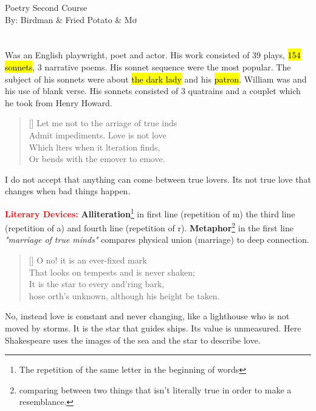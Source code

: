 \documentclass[12pt, a4paper]{article}
\begin{document}
\begin{center}
\huge{Poetry Second Course}\\[0.5cm]
\Large{By: Birdman \& Fried Potato \& Mơ}\\[1cm]
\end{center}

\section*{}
{\fontpar
Was an English playwright, poet and actor. His work consisted
of 39 plays, \hl{154 sonnets}, 3 narrative poems. His sonnet sequence were
the most popular. The subject of his sonnets were about \hl{the dark lady} and his \hl{patron}.
William was  and his use of blank verse. His 
sonnets consisted of 3 quatrains and a couplet which he 
took from Henry Howard.

\settowidth{\versewidth}{Let me not to the marriage of true minds}
\begin{verse}[\versewidth]
{\fontverse
Let me not to the arriage of true inds\\
Admit impediments. Love is not love \\
Which lters when it lteration finds,\\ 
Or bends with the emover to emove.
}
\end{verse}
I do not accept that anything can come between 
true lovers. Its not true love that changes when bad things
happen.\smallbreak

\textbf{\textcolor{red}{Literary Devices:}} \textbf{Alliteration}\footnote{
The repetition of the same letter in the beginning of words} 
in first line (repetition of m) the third line (repetition of a) and 
fourth line (repetition of r).  \textbf{Metaphor}\footnote{ comparing between
two things that isn't literally true in order to make a resemblance.}  
in the first line \textit{"marriage of true minds"} compares physical union 
(marriage) to deep connection.

\begin{verse}[\versewidth]
{\fontverse
O no! it is an ever-fixed mark\\
That looks on tempests and is never shaken;\\
It is the star to every and'ring bark,\\
hose orth's unknown, although his height be taken.\smallbreak
}
\end{verse}
No, instead love is constant and never changing,
like a lighthouse who is not moved by storms.
It is the star that guides ships. Its value 
is unmeasured. Here Shakespeare uses the images of the 
sea and the star to describe love.\smallbreak

}
\end{document}
